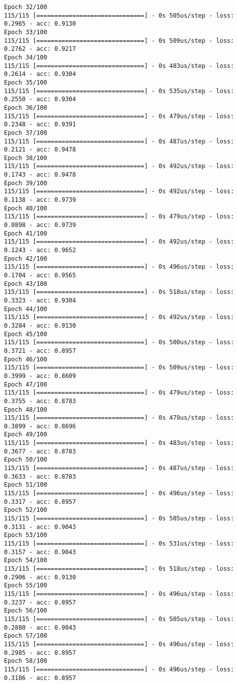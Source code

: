\documentclass[11pt]{article}
\begin{document}
\begin{Verbatim}[commandchars=\\\{\}]
Epoch 32/100
115/115 [==============================] - 0s 505us/step - loss: 0.2965 - acc: 0.9130
Epoch 33/100
115/115 [==============================] - 0s 509us/step - loss: 0.2762 - acc: 0.9217
Epoch 34/100
115/115 [==============================] - 0s 483us/step - loss: 0.2614 - acc: 0.9304
Epoch 35/100
115/115 [==============================] - 0s 535us/step - loss: 0.2550 - acc: 0.9304
Epoch 36/100
115/115 [==============================] - 0s 479us/step - loss: 0.2348 - acc: 0.9391
Epoch 37/100
115/115 [==============================] - 0s 487us/step - loss: 0.2121 - acc: 0.9478
Epoch 38/100
115/115 [==============================] - 0s 492us/step - loss: 0.1743 - acc: 0.9478
Epoch 39/100
115/115 [==============================] - 0s 492us/step - loss: 0.1138 - acc: 0.9739
Epoch 40/100
115/115 [==============================] - 0s 479us/step - loss: 0.0898 - acc: 0.9739
Epoch 41/100
115/115 [==============================] - 0s 492us/step - loss: 0.1243 - acc: 0.9652
Epoch 42/100
115/115 [==============================] - 0s 496us/step - loss: 0.1704 - acc: 0.9565
Epoch 43/100
115/115 [==============================] - 0s 518us/step - loss: 0.3323 - acc: 0.9304
Epoch 44/100
115/115 [==============================] - 0s 492us/step - loss: 0.3284 - acc: 0.9130
Epoch 45/100
115/115 [==============================] - 0s 500us/step - loss: 0.3721 - acc: 0.8957
Epoch 46/100
115/115 [==============================] - 0s 509us/step - loss: 0.3999 - acc: 0.8609
Epoch 47/100
115/115 [==============================] - 0s 479us/step - loss: 0.3755 - acc: 0.8783
Epoch 48/100
115/115 [==============================] - 0s 479us/step - loss: 0.3899 - acc: 0.8696
Epoch 49/100
115/115 [==============================] - 0s 483us/step - loss: 0.3677 - acc: 0.8783
Epoch 50/100
115/115 [==============================] - 0s 487us/step - loss: 0.3633 - acc: 0.8783
Epoch 51/100
115/115 [==============================] - 0s 496us/step - loss: 0.3317 - acc: 0.8957
Epoch 52/100
115/115 [==============================] - 0s 505us/step - loss: 0.3131 - acc: 0.9043
Epoch 53/100
115/115 [==============================] - 0s 531us/step - loss: 0.3157 - acc: 0.9043
Epoch 54/100
115/115 [==============================] - 0s 518us/step - loss: 0.2906 - acc: 0.9130
Epoch 55/100
115/115 [==============================] - 0s 496us/step - loss: 0.3237 - acc: 0.8957
Epoch 56/100
115/115 [==============================] - 0s 505us/step - loss: 0.2880 - acc: 0.9043
Epoch 57/100
115/115 [==============================] - 0s 496us/step - loss: 0.2985 - acc: 0.8957
Epoch 58/100
115/115 [==============================] - 0s 496us/step - loss: 0.3186 - acc: 0.8957

\end{Verbatim}
\end{document}
